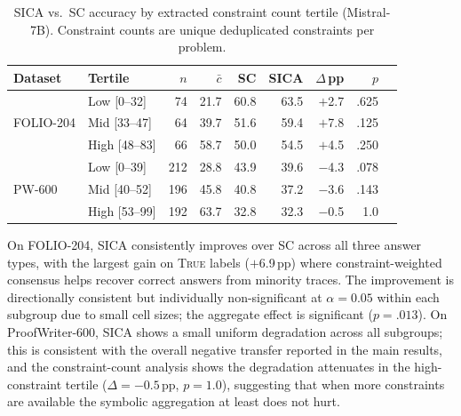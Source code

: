 \begin{table}[h]
\centering
\small
\caption{SICA vs.\ SC accuracy by extracted constraint count tertile (Mistral-7B). Constraint counts are unique deduplicated constraints per problem.}
\label{tab:subpop-constraint}
\begin{tabular}{ll rr rrr rr}
\toprule
\textbf{Dataset} & \textbf{Tertile} & $n$ & $\bar{c}$ & \textbf{SC} & \textbf{SICA} & $\Delta$\,pp & $p$ \\
\midrule
\multirow{3}{*}{FOLIO-204}
 & Low \scriptsize{[0--32]}   &  74 & 21.7 & 60.8 & 63.5 & $+$2.7 & .625 \\
 & Mid \scriptsize{[33--47]}  &  64 & 39.7 & 51.6 & 59.4 & $+$7.8 & .125 \\
 & High \scriptsize{[48--83]} &  66 & 58.7 & 50.0 & 54.5 & $+$4.5 & .250 \\
\midrule
\multirow{3}{*}{PW-600}
 & Low \scriptsize{[0--39]}   & 212 & 28.8 & 43.9 & 39.6 & $-$4.3 & .078 \\
 & Mid \scriptsize{[40--52]}  & 196 & 45.8 & 40.8 & 37.2 & $-$3.6 & .143 \\
 & High \scriptsize{[53--99]} & 192 & 63.7 & 32.8 & 32.3 & $-$0.5 & 1.0\hphantom{00} \\
\bottomrule
\end{tabular}
\end{table}

On FOLIO-204, SICA consistently improves over SC across all three answer types, with the largest gain on \textsc{True} labels ($+$6.9\,pp) where constraint-weighted consensus helps recover correct answers from minority traces.
The improvement is directionally consistent but individually non-significant at $\alpha{=}0.05$ within each subgroup due to small cell sizes; the aggregate effect is significant ($p{=}.013$).
On ProofWriter-600, SICA shows a small uniform degradation across all subgroups; this is consistent with the overall negative transfer reported in the main results, and the constraint-count analysis shows the degradation attenuates in the high-constraint tertile ($\Delta{=}{-}0.5$\,pp, $p{=}1.0$), suggesting that when more constraints are available the symbolic aggregation at least does not hurt.
